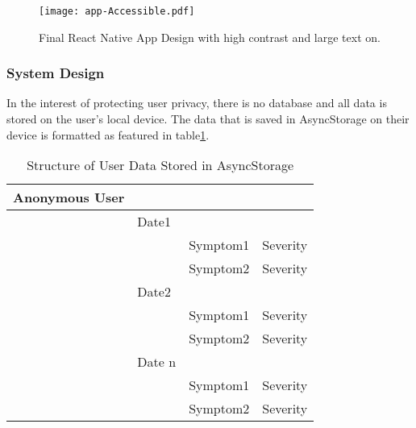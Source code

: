 \begin{figure}[h!!]
  \begin{center}
    \texttt{[image: app-Accessible.pdf]}
    \caption{Final React Native App Design with high contrast and large text on.}
    \label{figure:app-Accessible}
  \end{center}
\end{figure}

\subsubsection{System Design}
In the interest of protecting user privacy, there is no database and all data is stored on the user's local device. The data that is saved in AsyncStorage on their device is formatted as featured in table\ref{table:user-data}.

\begin{table}[h!!]
    \caption{Structure of User Data Stored in AsyncStorage}
    \label{table:user-data}
    \begin{tabular}{llll}
    \hline
    Anonymous User &        &          &          \\ \hline
                  & Date1  &          &          \\
                  &        & Symptom1 & Severity \\
                  &        & Symptom2 & Severity \\
                  & Date2  &          &          \\
                  &        & Symptom1 & Severity \\
                  &        & Symptom2 & Severity \\
                  & Date n &          &          \\
                  &        & Symptom1 & Severity \\
                  &        & Symptom2 & Severity \\ \hline
  \end{tabular}
\end{table}

